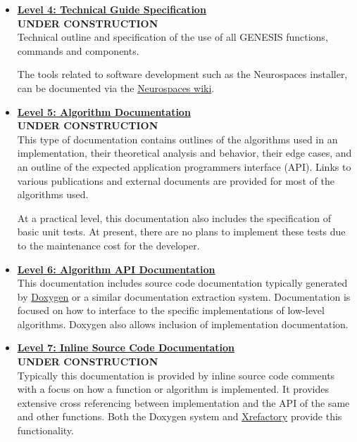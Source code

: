 \documentclass[12pt]{article}
\begin{document}
\begin{itemize}
\item[]\href{../contents-level4/contents-level4.tex}{\bf \underline{Level 4: Technical Guide Specification}}\\
  {\bf UNDER CONSTRUCTION}\\
  Technical outline and specification of the use of all GENESIS
  functions, commands and components.

  The tools related to software development such as the Neurospaces
  installer, can be documented via the
  \href{http://code.google.com/p/neurospaces/wiki/Index}{Neurospaces
    wiki}.

\item[]\href{../contents-level5/contents-level5.tex}{\bf \underline{Level 5: Algorithm Documentation}} \\
  {\bf UNDER CONSTRUCTION}\\
  This type of documentation contains outlines of the algorithms used
  in an implementation, their theoretical analysis and behavior, their
  edge cases, and an outline of the expected application programmers
  interface (API).  Links to various publications and external
  documents are provided for most of the algorithms used.

  At a practical level, this documentation also includes the
  specification of basic unit tests.  At present, there are no plans
  to implement these tests due to the maintenance cost for the
  developer.

\item[]\href{http://neurospaces.sourceforge.net/doxygen-menu.html}{\bf \underline{Level 6: Algorithm API Documentation}}\\
  This documentation includes source code documentation typically
  generated by \href{http://www.stack.nl/~dimitri/doxygen/}{Doxygen}
  or a similar documentation extraction system.  Documentation is
  focused on how to interface to the specific implementations of
  low-level algorithms. Doxygen also allows inclusion of
  implementation documentation.

\item[]\href{http://neurospaces.sourceforge.net/cxref-menu.html}{\bf \underline{Level 7: Inline Source Code Documentation}}\\
  {\bf UNDER CONSTRUCTION}\\
  Typically this documentation is provided by inline source code
  comments with a focus on how a function or algorithm is implemented.
  It provides extensive cross referencing between implementation and
  the API of the same and other functions.
  Both the Doxygen system and \href {http://www.xref.sk/xrefactory/main.html}{Xrefactory} provide this
  functionality.
  

\end{itemize}
\end{document}
